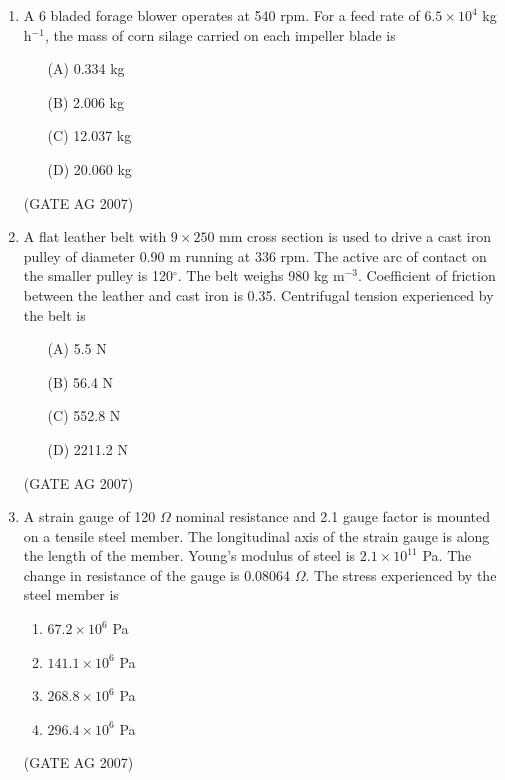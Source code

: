 \documentclass[journal,12pt,onecolumn]{IEEEtran}
\theoremstyle{remark}
\begin{document}
\begin{enumerate}[label=Q\arabic*:]
\item A 6 bladed forage blower operates at 540 rpm. For a feed rate of $6.5\times 10^{4}$ kg h$^{-1}$, the mass of corn silage carried on each impeller blade is  
\begin{multicols}{4}
\begin{enumerate}
    \item[(A)] 0.334 kg
    \item[(B)] 2.006 kg
    \item[(C)] 12.037 kg
    \item[(D)] 20.060 kg
\end{enumerate}
\end{multicols}
\hfill(GATE AG 2007)

\item A flat leather belt with $9\times 250$ mm cross section is used to drive a cast iron pulley of diameter 0.90 m running at 336 rpm. The active arc of contact on the smaller pulley is 120$^\circ$. The belt weighs 980 kg m$^{-3}$. Coefficient of friction between the leather and cast iron is 0.35. Centrifugal tension experienced by the belt is  
\begin{multicols}{4}
\begin{enumerate}
    \item[(A)] 5.5 N
    \item[(B)] 56.4 N
    \item[(C)] 552.8 N
    \item[(D)] 2211.2 N
\end{enumerate}
\end{multicols}
\hfill(GATE AG 2007)

\item A strain gauge of 120 $\Omega$ nominal resistance and 2.1 gauge factor is mounted on a tensile steel member. The longitudinal axis of the strain gauge is along the length of the member. Young's modulus of steel is $2.1\times 10^{11}$ Pa. The change in resistance of the gauge is 0.08064 $\Omega$. The stress experienced by the steel member is  

\begin{multicols}{4}
\begin{enumerate}
    \item $67.2\times 10^{6}$ Pa
    \item $141.1\times 10^{6}$ Pa
    \item $268.8\times 10^{6}$ Pa
    \item $296.4\times 10^{6}$ Pa
\end{enumerate}
\end{multicols}
\hfill(GATE AG 2007)


\end{enumerate}
\end{document}
